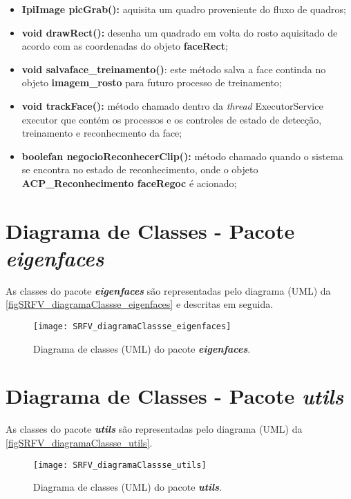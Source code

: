 \begin{itemize}
\begin{itemize}
		\item \textbf{IpiImage picGrab():} aquisita um quadro proveniente do fluxo de quadros;
		
		\item \textbf{void drawRect():} desenha um quadrado em volta do rosto aquisitado de acordo com as coordenadas do objeto \textbf{faceRect};
		
		\item \textbf{void salvaface\_treinamento()}: este método salva a face continda no objeto \textbf{imagem\_rosto} para futuro processo de treinamento;
		
		\item \textbf{void trackFace():} método chamado dentro da \textit{thread} ExecutorService executor que contém os processos e os controles de estado de detecção, treinamento e reconhecmento da face;
		
		\item \textbf{boolefan negocioReconhecerClip():} método chamado quando o sistema se encontra no estado de reconhecimento, onde o objeto \textbf{ACP\_Reconhecimento faceRegoc} é acionado;
	\end{itemize}
\end{itemize}

\section{Diagrama de Classes - Pacote \textit{\textbf{eigenfaces}}}\label{sec:diagclasses}
As classes do pacote \textbf{\textit{eigenfaces}} são representadas pelo diagrama (UML) da \autoref{figSRFV_diagramaClassse_eigenfaces} e descritas em seguida.

\begin{figure}[h]
	\centering
	\texttt{[image: SRFV\_diagramaClassse\_eigenfaces]}
	\caption{Diagrama de classes (UML) do pacote \textbf{\textit{eigenfaces}}.}
	\label{figSRFV_diagramaClassse_eigenfaces}
\end{figure}






\section{Diagrama de Classes - Pacote \textit{\textbf{utils}}}\label{sec:diagclasses}
As classes do pacote \textbf{\textit{utils}} são representadas pelo diagrama (UML) da \autoref{figSRFV_diagramaClassse_utils}. 

\begin{figure}[h]
	\centering
	\texttt{[image: SRFV\_diagramaClassse\_utils]}
	\caption{Diagrama de classes (UML) do pacote \textbf{\textit{utils}}.}
	\label{figSRFV_diagramaClassse_utils}
\end{figure}












%
